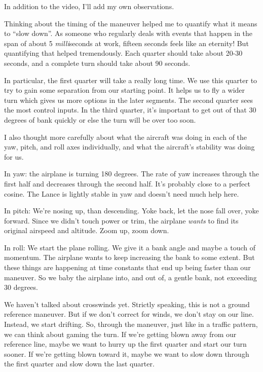 In addition to the video, I'll add my own observations.

Thinking about the timing of the maneuver helped me to quantify what it means to ``slow down''. As someone who regularly deals with events that happen in the span of about 5 \emph{milli}seconds at work, fifteen seconds feels like an eternity! But quantifying that helped tremendously. Each quarter should take about 20-30 seconds, and a complete turn should take about 90 seconds.

In particular, the first quarter will take a really long time. We use this quarter to try to gain some separation from our starting point. It helps us to fly a wider turn which gives us more options in the later segments. The second quarter sees the most control inputs. In the third quarter, it's important to get out of that 30 degrees of bank quickly or else the turn will be over too soon.

I also thought more carefully about what the aircraft was doing in each of the yaw, pitch, and roll axes individually, and what the aircraft's stability was doing for us.

In yaw: the airplane is turning 180 degrees. The rate of yaw increases through the first half and decreases through the second half. It's probably close to a perfect cosine. The Lance is lightly stable in yaw and doesn't need much help here.

In pitch: We're nosing up, than descending. Yoke back, let the nose fall over, yoke forward. Since we didn't touch power or trim, the airplane \emph{wants} to find its original airspeed and altitude. Zoom up, zoom down.

In roll: We start the plane rolling. We give it a bank angle and maybe a touch of momentum. The airplane wants to keep increasing the bank to some extent. But these things are happening at time constants that end up being faster than our maneuver. So we baby the airplane into, and out of, a gentle bank, not exceeding 30 degrees.

We haven't talked about crosswinds yet. Strictly speaking, this is not a ground reference maneuver. But if we don't correct for winds, we don't stay on our line. Instead, we start drifting. So, through the maneuver, just like in a traffic pattern, we can think about gaming the turn. If we're getting blown away from our reference line, maybe we want to hurry up the first quarter and start our turn sooner. If we're getting blown toward it, maybe we want to slow down through the first quarter and slow down the last quarter.

